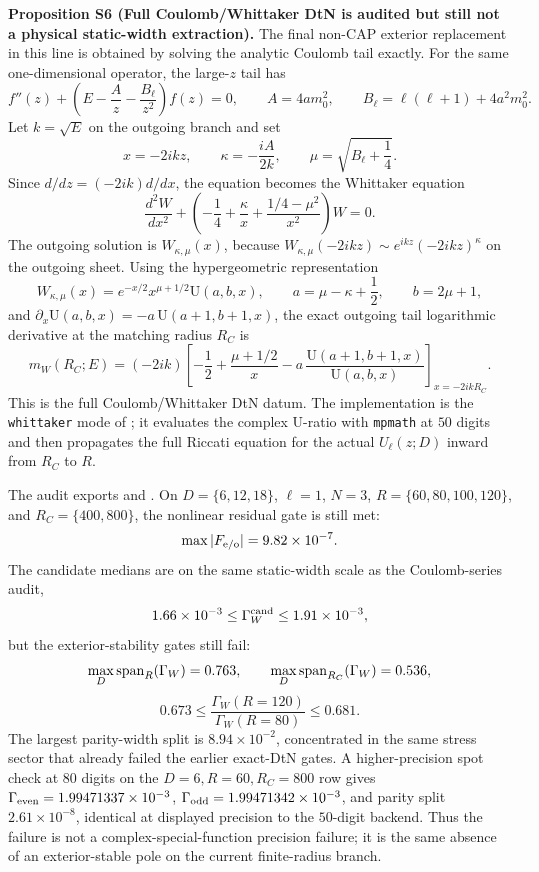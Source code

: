 \documentclass[aps,prd,onecolumn,notitlepage,nofootinbib,superscriptaddress,11pt,floatfix]{revtex4-2}
\begin{document}
\medskip\noindent\textbf{Proposition S6 (Full Coulomb/Whittaker DtN is audited but still not a physical static-width extraction).}
The final non-CAP exterior replacement in this line is obtained by solving the analytic Coulomb tail exactly.  For the same one-dimensional operator, the large-\(z\) tail has
\[
f''(z)+\left(E-\frac{A}{z}-\frac{B_\ell}{z^2}\right)f(z)=0,
\qquad
A=4am_0^2,\qquad
B_\ell=\ell(\ell+1)+4a^2m_0^2 .
\]
Let \(k=\sqrt{E}\) on the outgoing branch and set
\[
x=-2ikz,\qquad
\kappa=-\frac{iA}{2k},\qquad
\mu=\sqrt{B_\ell+\frac14}.
\]
Since \(d/dz=(-2ik)d/dx\), the equation becomes the Whittaker equation~\cite{Olver2010}
\[
\frac{d^2W}{dx^2}
+\left(-\frac14+\frac{\kappa}{x}+\frac{1/4-\mu^2}{x^2}\right)W=0 .
\]
The outgoing solution is \(W_{\kappa,\mu}(x)\), because
\(W_{\kappa,\mu}(-2ikz)\sim e^{ikz}(-2ikz)^\kappa\) on the outgoing sheet.  Using the hypergeometric representation
\[
W_{\kappa,\mu}(x)=e^{-x/2}x^{\mu+1/2}
\mathrm{U}\!\left(a,b,x\right),
\qquad
a=\mu-\kappa+\frac12,\qquad b=2\mu+1,
\]
and \(\partial_x\mathrm{U}(a,b,x)=-a\,\mathrm{U}(a+1,b+1,x)\), the exact outgoing tail logarithmic derivative at the matching radius \(R_C\) is
\[
m_W(R_C;E)
=(-2ik)\left[
-\frac12+\frac{\mu+1/2}{x}
-a\,\frac{\mathrm{U}(a+1,b+1,x)}{\mathrm{U}(a,b,x)}
\right]_{x=-2ikR_C}.
\]
This is the full Coulomb/Whittaker DtN datum.  The implementation is the \texttt{whittaker} mode of ; it evaluates the complex \(\mathrm{U}\)-ratio with \texttt{mpmath} at \(50\) digits and then propagates the full Riccati equation for the actual \(U_\ell(z;D)\) inward from \(R_C\) to \(R\).

The audit exports  and .  On \(D=\{6,12,18\}\), \(\ell=1\), \(N=3\), \(R=\{60,80,100,120\}\), and \(R_C=\{400,800\}\), the nonlinear residual gate is still met:
\[
\max |F_{\rm e/o}|=9.82\times10^{-7}.
\]
The candidate medians are on the same static-width scale as the Coulomb-series audit,
\[
1.66\times10^{-3}\leq \Gamma_W^{\rm cand}\leq 1.91\times10^{-3},
\]
but the exterior-stability gates still fail:
\[
\max_D{\rm span}_R(\Gamma_W)=0.763,\qquad
\max_D{\rm span}_{R_C}(\Gamma_W)=0.536,
\]
\[
0.673\leq
\frac{\Gamma_W(R=120)}{\Gamma_W(R=80)}
\leq0.681 .
\]
The largest parity-width split is \(8.94\times10^{-2}\), concentrated in the same stress sector that already failed the earlier exact-DtN gates.  A higher-precision spot check at \(80\) digits on the \(D=6,R=60,R_C=800\) row gives \(\Gamma_{\rm even}=1.99471337\times10^{-3}\), \(\Gamma_{\rm odd}=1.99471342\times10^{-3}\), and parity split \(2.61\times10^{-8}\), identical at displayed precision to the \(50\)-digit backend.  Thus the failure is not a complex-special-function precision failure; it is the same absence of an exterior-stable pole on the current finite-radius branch.
\end{document}
